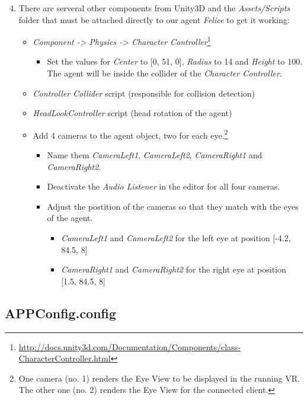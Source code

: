\documentclass[10pt,final]{scrreprt}
\begin{document}
\begin{enumerate}
\setcounter{enumi}{3}
\item There are serveral other components from Unity3D and the \emph{Assets/Scripts} folder that must be attached directly %
to our agent \emph{Felice} to get it working:
\begin{itemize}
\item \emph{Component -> Physics -> Character Controller}\footnote{\url{http://docs.unity3d.com/Documentation/Components/class-CharacterController.html}}
\begin{itemize}
\item Set the values for \emph{Center} to [0, 51, 0], \emph{Radius} to 14 and \emph{Height} to 100. The agent will be inside the collider of the \emph{Character Controller}.
\end{itemize}
\item \emph{Controller Collider} script (responsible for collision detection)
\item \emph{HeadLookController} script (head rotation of the agent)
\item Add 4 cameras to the agent object, two for each eye.\footnote{One camera (no. 1) renders the Eye View to be displayed in the running VR. The other one (no. 2) renders the Eye View for the connected client.}
\begin{itemize}
\item Name them \emph{CameraLeft1}, \emph{CameraLeft2}, \emph{CameraRight1} and \emph{CameraRight2}.
\item Deactivate the \emph{Audio Listener} in the editor for all four cameras.
\item Adjust the postition of the cameras so that they match with the eyes of the agent. 
\begin{itemize}
\item \emph{CameraLeft1} and  \emph{CameraLeft2} for the left eye at position [-4.2, 84.5, 8]
\item \emph{CameraRight1} and  \emph{CameraRight2} for the right eye at position [1.5, 84.5, 8]
\end{itemize}
\end{itemize}
\end{itemize}
\end{enumerate}



\newpage
\subsection{APPConfig.config}
\end{document}
